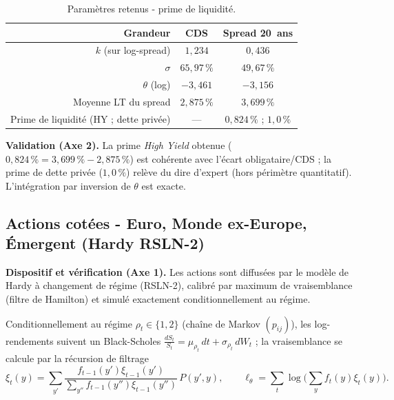 \documentclass[11pt,a4paper]{article}
\renewcommand{\arraystretch}{1.4}
\newcommand{\tablehead}[1]{\textcolor{nxnavy}{\sffamily\bfseries\small #1}}
\begin{document}
\begin{table}[H]
\centering\small
\renewcommand{\arraystretch}{1.4}\setlength{\tabcolsep}{6pt}
\begin{tabularx}{\linewidth}{R C C}
\toprule
\tablehead{Grandeur} & \tablehead{CDS} & \tablehead{Spread 20~ans} \\
\midrule
{} $k$ (sur log-spread) & $1{,}234$ & $0{,}436$ \\
$\sigma$ & $65{,}97\,\%$ & $49{,}67\,\%$ \\
 $\theta$ (log) & $-3{,}461$ & $-3{,}156$ \\
Moyenne LT du spread & $2{,}875\,\%$ & $3{,}699\,\%$ \\
 Prime de liquidité (HY ; dette privée) & --- & $0{,}824\,\%$ ; $1{,}0\,\%$ \\
\bottomrule
\end{tabularx}
\caption{Paramètres retenus - prime de liquidité.}
\end{table}

\textbf{Validation (Axe 2).} La prime \emph{High Yield} obtenue ($0{,}824\,\%=3{,}699\,\%-2{,}875\,\%$) est cohérente avec l'écart obligataire/CDS ; la prime de dette privée ($1{,}0\,\%$) relève du dire d'expert (hors périmètre quantitatif). L'intégration par inversion de $\theta$ est exacte.

\subsection{Actions cotées - Euro, Monde ex-Europe, Émergent (Hardy RSLN-2)}

\textbf{Dispositif et vérification (Axe 1).} Les actions sont diffusées par le modèle de Hardy à changement de régime (RSLN-2), calibré par maximum de vraisemblance (filtre de Hamilton) et simulé exactement conditionnellement au régime.
\begin{definitionbox}
Conditionnellement au régime $\rho_t\in\{1,2\}$ (chaîne de Markov $(p_{ij})$), les log-rendements suivent un Black-Scholes $\tfrac{dS_t}{S_t}=\mu_{\rho_t}\,dt+\sigma_{\rho_t}\,dW_t$ ; la vraisemblance se calcule par la récursion de filtrage
\[
\xi_t(y)=\sum_{y'}\frac{f_{t-1}(y')\xi_{t-1}(y')}{\sum_{y''}f_{t-1}(y'')\xi_{t-1}(y'')}\,P(y',y),\qquad
\ell_\theta=\sum_t\log\Big(\sum_y f_t(y)\xi_t(y)\Big).
\]
\end{definitionbox}
\end{document}
